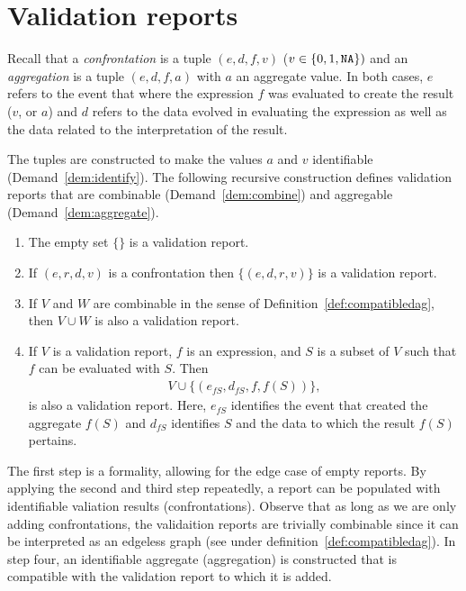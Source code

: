 \section{Validation reports}
\label{sect:basicreports}
Recall that a \emph{confrontation} is a tuple $(e,d,f,v)$ ($v\in\{0,1,{\normalfont \texttt{NA}}{}\})$
and an \emph{aggregation} is a tuple $(e,d,f,a)$ with $a$ an aggregate value.
In both cases, $e$ refers to the event that where the expression $f$ was
evaluated to create the result ($v$, or $a$) and $d$ refers to the data evolved
in evaluating the expression as well as the data related to the interpretation
of the result. 

The tuples are constructed to make  the values $a$ and $v$ identifiable
(Demand~\ref{dem:identify}).  The following recursive construction defines
validation reports that are combinable (Demand~\ref{dem:combine}) and
aggregable (Demand~\ref{dem:aggregate}).
%
\begin{definition}\leavevmode
\begin{enumerate}[topsep=0pt,itemsep=0pt]
\item The empty set $\{\}$ is a validation report.
\item If $(e,r,d,v)$ is a confrontation then $\{(e,d,r,v)\}$ is a validation report.
\item If $V$ and $W$ are combinable in the sense of
Definition~\ref{def:compatibledag}, then $V\cup W$ is also a validation report.
\item If $V$ is a validation report, $f$ is an expression, and  $S$ is a subset of $V$  
such that $f$ can be evaluated with $S$. Then 
\begin{align*}
V\cup \{(e_{fS}, d_{fS}, f, f(S))\},
\end{align*}
is also a validation report. Here, $e_{fS}$ identifies the event that created
the aggregate $f(S)$ and $d_{fS}$ identifies $S$ and the data to which the
result $f(S)$ pertains.
\end{enumerate}
\label{def:basicvalidationreport}
\end{definition}
%
The first step is a formality, allowing for the edge case of empty reports.  By
applying the second and third step repeatedly, a report can be populated with
identifiable valiation results (confrontations). Observe that as long as we are
only adding confrontations, the validaition reports are trivially combinable
since it can be interpreted as an edgeless graph (see under
definition~\ref{def:compatibledag}). In step four, an identifiable aggregate
(aggregation) is constructed that is compatible with the validation report to
which it is added.


